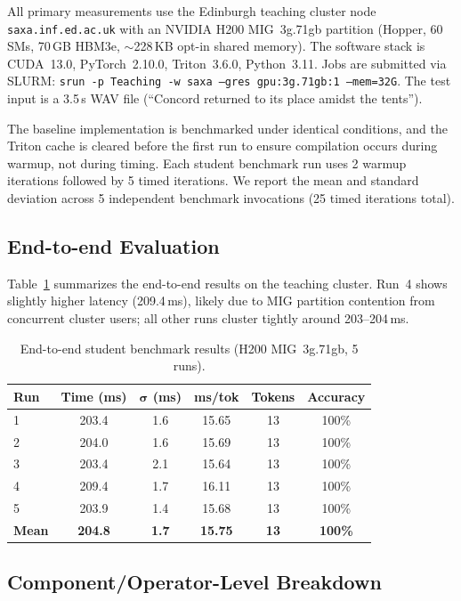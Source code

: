 \documentclass{article}
\begin{document}
All primary measurements use the Edinburgh teaching cluster node \texttt{saxa.inf.ed.ac.uk} with an NVIDIA H200 MIG~3g.71gb partition (Hopper, 60 SMs, 70\,GB HBM3e, $\sim$228\,KB opt-in shared memory).
The software stack is CUDA~13.0, PyTorch~2.10.0, Triton~3.6.0, Python~3.11.
Jobs are submitted via SLURM: \texttt{srun -p Teaching -w saxa --gres gpu:3g.71gb:1 --mem=32G}.
The test input is a 3.5\,s WAV file (``Concord returned to its place amidst the tents'').

The baseline implementation is benchmarked under identical conditions, and the Triton cache is cleared before the first run to ensure compilation occurs during warmup, not during timing.
Each student benchmark run uses 2 warmup iterations followed by 5 timed iterations.  We report the mean and standard deviation across 5 independent benchmark invocations (25 timed iterations total).

\subsection{End-to-end Evaluation}

Table~\ref{tab:e2e} summarizes the end-to-end results on the teaching cluster.  Run~4 shows slightly higher latency (209.4\,ms), likely due to MIG partition contention from concurrent cluster users; all other runs cluster tightly around 203--204\,ms.

\begin{table}[h]
\centering
\caption{End-to-end student benchmark results (H200 MIG~3g.71gb, 5 runs).}
\label{tab:e2e}
\small
\begin{tabular}{@{}lccccc@{}}
\toprule
\textbf{Run} & \textbf{Time (ms)} & $\boldsymbol{\sigma}$ \textbf{(ms)} & \textbf{ms/tok} & \textbf{Tokens} & \textbf{Accuracy} \\
\midrule
1 & 203.4 & 1.6 & 15.65 & 13 & 100\% \\
2 & 204.0 & 1.6 & 15.69 & 13 & 100\% \\
3 & 203.4 & 2.1 & 15.64 & 13 & 100\% \\
4 & 209.4 & 1.7 & 16.11 & 13 & 100\% \\
5 & 203.9 & 1.4 & 15.68 & 13 & 100\% \\
\midrule
\textbf{Mean} & \textbf{204.8} & \textbf{1.7} & \textbf{15.75} & \textbf{13} & \textbf{100\%} \\
\bottomrule
\end{tabular}
\end{table}

\subsection{Component/Operator-Level Breakdown}
\end{document}
